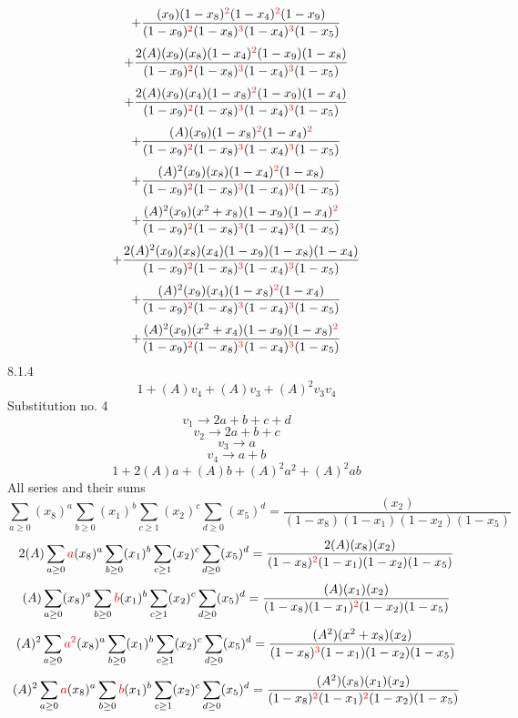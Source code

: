 \documentclass{article}
\begin{document}
\[+\frac{(x_9)(1-x_8)^{\textcolor{red}{2}}(1-x_4)^{\textcolor{red}{2}}(1-x_9)}{(1-x_9)^{\textcolor{red}{2}}(1-x_8)^{\textcolor{red}{3}}(1-x_4)^{\textcolor{red}{3}}(1-x_5)}\]\[+\frac{2(A)(x_9)(x_8)(1-x_4)^{\textcolor{red}{2}}(1-x_9)(1-x_8)}{(1-x_9)^{\textcolor{red}{2}}(1-x_8)^{\textcolor{red}{3}}(1-x_4)^{\textcolor{red}{3}}(1-x_5)}\]\[+\frac{2(A)(x_9)(x_4)(1-x_8)^{\textcolor{red}{2}}(1-x_9)(1-x_4)}{(1-x_9)^{\textcolor{red}{2}}(1-x_8)^{\textcolor{red}{3}}(1-x_4)^{\textcolor{red}{3}}(1-x_5)}\]\[+\frac{(A)(x_9)(1-x_8)^{\textcolor{red}{2}}(1-x_4)^{\textcolor{red}{2}}}{(1-x_9)^{\textcolor{red}{2}}(1-x_8)^{\textcolor{red}{3}}(1-x_4)^{\textcolor{red}{3}}(1-x_5)}\]\[+\frac{(A)^{2}(x_9)(x_8)(1-x_4)^{\textcolor{red}{2}}(1-x_8)}{(1-x_9)^{\textcolor{red}{2}}(1-x_8)^{\textcolor{red}{3}}(1-x_4)^{\textcolor{red}{3}}(1-x_5)}\]\[+\frac{(A)^{2}(x_9)(x^{2}+x_8)(1-x_9)(1-x_4)^{\textcolor{red}{2}}}{(1-x_9)^{\textcolor{red}{2}}(1-x_8)^{\textcolor{red}{3}}(1-x_4)^{\textcolor{red}{3}}(1-x_5)}\]\[+\frac{2(A)^{2}(x_9)(x_8)(x_4)(1-x_9)(1-x_8)(1-x_4)}{(1-x_9)^{\textcolor{red}{2}}(1-x_8)^{\textcolor{red}{3}}(1-x_4)^{\textcolor{red}{3}}(1-x_5)}\]\[+\frac{(A)^{2}(x_9)(x_4)(1-x_8)^{\textcolor{red}{2}}(1-x_4)}{(1-x_9)^{\textcolor{red}{2}}(1-x_8)^{\textcolor{red}{3}}(1-x_4)^{\textcolor{red}{3}}(1-x_5)}\]\[+\frac{(A)^{2}(x_9)(x^{2}+x_4)(1-x_9)(1-x_8)^{\textcolor{red}{2}}}{(1-x_9)^{\textcolor{red}{2}}(1-x_8)^{\textcolor{red}{3}}(1-x_4)^{\textcolor{red}{3}}(1-x_5)}\]
8.1.4
\[1+(A)v_4+(A)v_3+(A)^2v_3v_4\]Substitution no. 4\[v_1\rightarrow{2a+b+c+d}\]\[v_2\rightarrow{2a+b+c}\]\[v_3\rightarrow{a}\]\[v_4\rightarrow{a+b}\]\[1+2(A)a+(A)b+(A)^2a^{2}+(A)^2ab\]All series and their sums\[\sum_{a\geq{0}}(x_8)^{a}\sum_{b\geq{0}}(x_1)^{b}\sum_{c\geq{1}}(x_2)^{c}\sum_{d\geq{0}}(x_5)^{d}=\frac{(x_2)}{(1-x_8)(1-x_1)(1-x_2)(1-x_5)}\]\[2(A)\sum_{a\geq{0}}\textcolor{red}{a}(x_8)^{a}\sum_{b\geq{0}}(x_1)^{b}\sum_{c\geq{1}}(x_2)^{c}\sum_{d\geq{0}}(x_5)^{d}=\frac{2(A)(x_8)(x_2)}{(1-x_8)^{\textcolor{red}{2}}(1-x_1)(1-x_2)(1-x_5)}\]\[(A)\sum_{a\geq{0}}(x_8)^{a}\sum_{b\geq{0}}\textcolor{red}{b}(x_1)^{b}\sum_{c\geq{1}}(x_2)^{c}\sum_{d\geq{0}}(x_5)^{d}=\frac{(A)(x_1)(x_2)}{(1-x_8)(1-x_1)^{\textcolor{red}{2}}(1-x_2)(1-x_5)}\]\[(A)^{2}\sum_{a\geq{0}}\textcolor{red}{a^{2}}(x_8)^{a}\sum_{b\geq{0}}(x_1)^{b}\sum_{c\geq{1}}(x_2)^{c}\sum_{d\geq{0}}(x_5)^{d}=\frac{(A^{2})(x^{2}+x_8)(x_2)}{(1-x_8)^{\textcolor{red}{3}}(1-x_1)(1-x_2)(1-x_5)}\]\[(A)^{2}\sum_{a\geq{0}}\textcolor{red}{a}(x_8)^{a}\sum_{b\geq{0}}\textcolor{red}{b}(x_1)^{b}\sum_{c\geq{1}}(x_2)^{c}\sum_{d\geq{0}}(x_5)^{d}=\frac{(A^{2})(x_8)(x_1)(x_2)}{(1-x_8)^{\textcolor{red}{2}}(1-x_1)^{\textcolor{red}{2}}(1-x_2)(1-x_5)}\]
\end{document}
